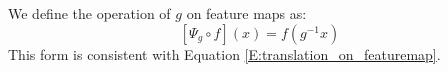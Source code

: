 \documentclass{IEEEtran}
\newcommand{\calx}{\mathcal{X}}
\begin{document}
We define the operation of $g$ on feature maps as: 
\begin{equation}
    \label{E:g_on_featuremap}
    [\Psi_g \circ f] (x) = f(g^{-1}x)
\end{equation}
This form is consistent with Equation \eqref{E:translation_on_featuremap}.

\end{document}
